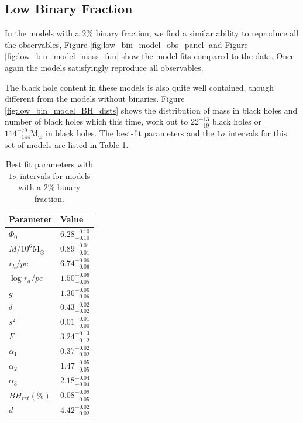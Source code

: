 \subsection{Low Binary Fraction}

In the models with a $2\%$ binary fraction, we find a similar ability to reproduce all the
observables, Figure \ref{fig:low_bin_model_obs_panel} and Figure \ref{fig:low_bin_model_mass_fun}
show the model fits compared to the data. Once again the models satisfyingly reproduce all
observables.

The black hole content in these models is also quite well contained, though different from the
models without binaries. Figure \ref{fig:low_bin_model_BH_dists} shows the distribution of mass in
black holes and number of black holes which this time, work out to $22^{+13}_{-19}$ black holes or
$114^{+79}_{-144} \mathrm{M}_\odot$ in black holes. The best-fit parameters and the $1\sigma$
intervals for this set of models are listed in Table \ref{tab:parameters_lowbin}.


\begin{table}
	\centering
	\caption{Best fit parameters with $1\sigma$ intervals for models with a $2\%$ binary fraction.}
	\begin{tabular}{l l}

		\hline
		Parameter                 & Value                  \\
		\hline
		$\Phi_0$                  & $6.28^{+0.10}_{-0.10}$ \\
		$M/10^6 \mathrm{M}_\odot$ & $0.89^{+0.01}_{-0.01}$ \\
		$r_h / pc$                & $6.74^{+0.06}_{-0.06}$ \\
		$\log{r_a / pc}$          & $1.50^{+0.06}_{-0.05}$ \\
		$g$                       & $1.36^{+0.06}_{-0.06}$ \\
		$\delta$                  & $0.43^{+0.02}_{-0.02}$ \\
		$s^2$                     & $0.01^{+0.01}_{-0.00}$ \\
		$F$                       & $3.24^{+0.13}_{-0.12}$ \\
		$\alpha_1$                & $0.37^{+0.02}_{-0.02}$ \\
		$\alpha_2$                & $1.47^{+0.05}_{-0.05}$ \\
		$\alpha_3$                & $2.18^{+0.04}_{-0.04}$ \\
		$BH_{ret} (\%)$           & $0.08^{+0.09}_{-0.05}$ \\
		$d$                       & $4.42^{+0.02}_{-0.02}$ \\
		\hline
	\end{tabular}
	\label{tab:parameters_lowbin}
\end{table}

